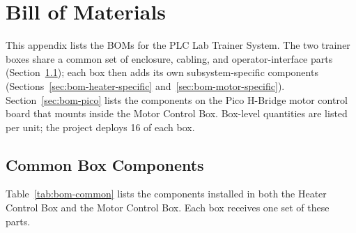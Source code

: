 \documentclass[main.tex]{subfiles}
\begin{document}
\section{Bill of Materials}
\label{app:bom}

This appendix lists the BOMs for the PLC Lab Trainer System. The two trainer boxes share a common set of enclosure, cabling, and operator-interface parts (Section~\ref{sec:bom-common}); each box then adds its own subsystem-specific components (Sections~\ref{sec:bom-heater-specific} and~\ref{sec:bom-motor-specific}). Section~\ref{sec:bom-pico} lists the components on the Pico H-Bridge motor control board that mounts inside the Motor Control Box. Box-level quantities are listed per unit; the project deploys 16 of each box.

\subsection{Common Box Components}
\label{sec:bom-common}

Table~\ref{tab:bom-common} lists the components installed in both the Heater Control Box and the Motor Control Box. Each box receives one set of these parts.
\end{document}
